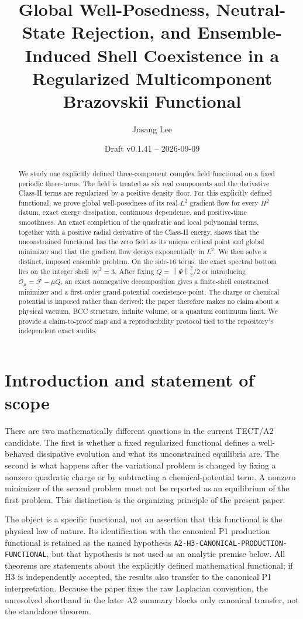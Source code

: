 \documentclass[11pt]{article}
\title{Global Well-Posedness, Neutral-State Rejection, and
       Ensemble-Induced Shell Coexistence in a Regularized
       Multicomponent Brazovskii Functional}
\author{Jusang Lee}
\date{Draft v0.1.41 -- 2026-09-09}
\numberwithin{equation}{section}
\theoremstyle{definition}
\newcommand{\cF}{\mathcal F}
\newcommand{\cO}{\mathcal O}
\newcommand{\norm}[1]{\left\lVert#1\right\rVert}
\begin{document}
\maketitle

\begin{abstract}
We study one explicitly defined three-component complex field functional on a
fixed periodic three-torus.  The field is treated as six real components and
the derivative Class-II terms are regularized by a positive density floor.
For this explicitly defined functional, we prove global well-posedness of its
real-$L^2$ gradient flow for every $H^2$ datum, exact energy dissipation,
continuous dependence, and positive-time smoothness.  An exact completion of
the quadratic and local polynomial terms, together with a positive radial
derivative of the Class-II energy, shows that the unconstrained functional has
the zero field as its unique critical point and global minimizer and that the
gradient flow decays exponentially in $L^2$.  We then solve a distinct,
imposed ensemble problem.  On the side-$16$ torus, the exact spectral bottom
lies on the integer shell $|n|^2=3$.  After fixing
$Q=\norm{\Psi}_{2}^{2}/2$ or introducing
$\cO_\mu=\cF-\mu Q$, an exact nonnegative decomposition gives a finite-shell
constrained minimizer and a first-order grand-potential coexistence point.
The charge or chemical potential is imposed rather than derived; the paper
therefore makes no claim about a physical vacuum, BCC structure, infinite
volume, or a quantum continuum limit.  We provide a claim-to-proof map and a
reproducibility protocol tied to the repository's independent exact audits.
\end{abstract}

\section{Introduction and statement of scope}

There are two mathematically different questions in the current TECT/A2
candidate.  The first is whether a fixed regularized functional defines a
well-behaved dissipative evolution and what its unconstrained equilibria are.
The second is what happens after the variational problem is changed by fixing
a nonzero quadratic charge or by subtracting a chemical-potential term.  A
nonzero minimizer of the second problem must not be reported as an equilibrium
of the first problem.  This distinction is the organizing principle of the
present paper.

The object is a specific functional, not an assertion that this functional is
the physical law of nature.  Its identification with the canonical P1
production functional is retained as the named hypothesis
\texttt{A2-H3-CANONICAL-PRODUCTION-FUNCTIONAL}, but that hypothesis is not used
as an analytic premise below.  All theorems are statements about the explicitly
defined mathematical functional; if H3 is independently accepted, the results
also transfer to the canonical P1 interpretation.  Because the paper fixes the
raw Laplacian convention, the unresolved shorthand in the later A2 summary
blocks only canonical transfer, not the standalone theorem.
\end{document}
